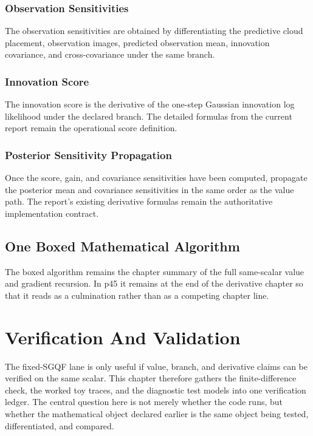 \documentclass[11pt]{article}
\numberwithin{equation}{section}
\begin{document}
\subsubsection{Observation Sensitivities}
\label{subsec:p31-observation-sensitivities}

The observation sensitivities are obtained by differentiating the predictive cloud
placement, observation images, predicted observation mean, innovation covariance,
and cross-covariance under the same branch.

\subsubsection{Innovation Score}
\label{subsec:p31-innovation-score}

The innovation score is the derivative of the one-step Gaussian innovation log
likelihood under the declared branch.  The detailed formulas from the current
report remain the operational score definition.

\subsubsection{Posterior Sensitivity Propagation}
\label{subsec:p31-posterior-sensitivity}

Once the score, gain, and covariance sensitivities have been computed, propagate
the posterior mean and covariance sensitivities in the same order as the value
path.  The report's existing derivative formulas remain the authoritative
implementation contract.

\subsection{One Boxed Mathematical Algorithm}
\label{sec:p31-boxed-algorithm}

The boxed algorithm remains the chapter summary of the full same-scalar value and
gradient recursion.  In p45 it remains at the end of the derivative chapter so
that it reads as a culmination rather than as a competing chapter line.

\section{Verification And Validation}
\label{sec:p31-fd}

The fixed-SGQF lane is only useful if value, branch, and derivative claims can be
verified on the same scalar.  This chapter therefore gathers the finite-difference
check, the worked toy traces, and the diagnostic test models into one verification
ledger.  The central question here is not merely whether the code runs, but
whether the mathematical object declared earlier is the same object being tested,
differentiated, and compared.
\end{document}
